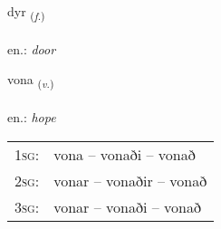 \documentclass[frontgrid, backgrid]{flacards}\usepackage[]{graphicx}\usepackage[]{xcolor}
\begin{document}
\renewcommand{\flhead}{\vskip5pt \fboxsep=0pt {\small\bfseries\footnotesize Nafnorð | Noun}}
\renewcommand{\fcfoot}{\vskip5pt \fboxsep=0pt \hspace{2pt}{\small\bfseries\footnotesize 1K}}

\renewcommand{\blhead}{\vskip5pt {\small\bfseries\footnotesize Nafnorð | Noun }}
\renewcommand{\bcfoot}{\vskip5pt \hspace{2pt}{\small\bfseries\footnotesize 1K}}


{dyr \small{\textsubscript{(\textit{f.})}} \\[1ex] %
\textphonetic{[tɪːr]} \\
en.: \emph{door} \\  [2ex]
\renewcommand*{\arraystretch}{0.8}
}

\renewcommand{\flhead}{\vskip5pt \fboxsep=0pt {\small\bfseries\footnotesize Sagnorð | Verb}}
\renewcommand{\fcfoot}{\vskip5pt \fboxsep=0pt \hspace{2pt}{\small\bfseries\footnotesize 1K}}

\renewcommand{\blhead}{\vskip5pt {\small\bfseries\footnotesize Sagnorð | Verb }}
\renewcommand{\bcfoot}{\vskip5pt \hspace{2pt}{\small\bfseries\footnotesize 1K}}


{vona \small{\textsubscript{(\textit{v.})}} \\[1ex] %
\textphonetic{[vɔːna]} \\
en.: \emph{hope} \\  [2ex]
\renewcommand*{\arraystretch}{0.8}
\begin{tabular}{p{1cm}l}
\textsc{1sg}: & vona -- vonaði -- vonað \\ 
\textsc{2sg}: & vonar -- vonaðir -- vonað \\ 
\textsc{3sg}: & vonar -- vonaði -- vonað \\ 
\end{tabular}
}
\end{document}
